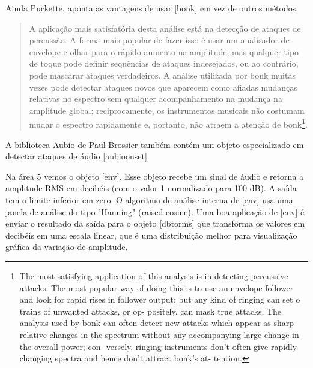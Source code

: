 \documentclass{ppgmus}
\begin{document}
Ainda Puckette, aponta as vantagens de usar [bonk\texttildelow]
em vez de outros métodos.

\begin{quote}
A aplicação mais satisfatória desta análise está na
detecção de ataques de percussão. A forma mais popular
de fazer isso é usar um analisador de envelope e olhar
para o rápido aumento na amplitude, mas qualquer tipo de
toque pode definir sequências de ataques indesejados, ou ao contrário, 
pode mascarar ataques verdadeiros. A análise utilizada por
bonk muitas vezes pode detectar ataques novos que aparecem como
afiadas mudanças relativas no espectro sem qualquer
acompanhamento na mudança na amplitude global; reciprocamente, 
os instrumentos musicais não costumam mudar o espectro rapidamente
e, portanto, não atraem a atenção de bonk\footnote
{The most satisfying application of this analysis is in
detecting percussive attacks. The most popular way
of doing this is to use an envelope follower and look
for rapid rises in follower output; but any kind of
ringing can set o trains of unwanted attacks, or op-
positely, can mask true attacks. The analysis used by
bonk can often detect new attacks which appear as
sharp relative changes in the spectrum without any
accompanying large change in the overall power; con-
versely, ringing instruments don't often give rapidly
changing spectra and hence don't attract bonk's at-
tention.}. \cite{bonk}
\end{quote}

A biblioteca Aubio de Paul Brossier também contém um objeto
especializado em detectar ataques de áudio [aubioonset\texttildelow].



Na área 5 vemos o objeto [env\texttildelow]. Esse objeto recebe um sinal de áudio
e retorna a amplitude RMS em decibéis (com o valor 1 normalizado para 100 dB).
A saída tem o limite inferior em zero. O algoritmo de análise interna de [env\texttildelow]
usa uma janela de análise do tipo "Hanning" (raised cosine). Uma boa aplicação de 
[env\texttildelow] é enviar o resultado da saída para o objeto [dbtorms] que transforma
os valores em decibéis em uma escala linear, que é uma distribuição melhor para visualização
gráfica da variação de amplitude.
\end{document}

